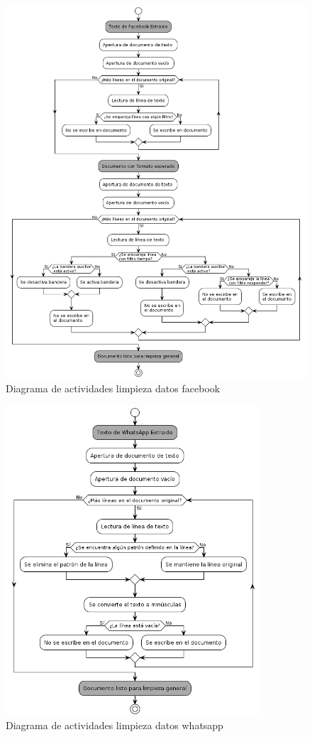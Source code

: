 \begin{figure}
	\includegraphics[width=1\textwidth]{capitulo5/figuras/prueba.png}
	\caption{Diagrama de actividades limpieza datos facebook}
	\label{fig:um12}
\end{figure}

\begin{figure}
	\includegraphics[width=0.85\textwidth]{capitulo5/figuras/part3.png}
	\caption{Diagrama de actividades limpieza datos whatsapp}
	\label{fig:um13}
\end{figure}



